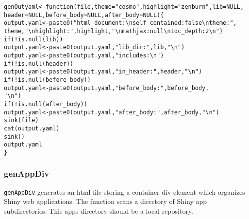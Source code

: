 \documentclass{article}\usepackage[]{graphicx}\usepackage[]{color}
\makeatletter
\newcommand{\hlstr}[1]{\textcolor[rgb]{0.863,0.196,0.184}{#1}}%
\newcommand{\hlopt}[1]{\textcolor[rgb]{0.576,0.631,0.631}{#1}}%
\newcommand{\hlstd}[1]{\textcolor[rgb]{0.514,0.58,0.588}{#1}}%
\newcommand{\hlkwa}[1]{\textcolor[rgb]{0.796,0.294,0.086}{#1}}%
\newcommand{\hlkwb}[1]{\textcolor[rgb]{0.522,0.6,0}{#1}}%
\newcommand{\hlkwc}[1]{\textcolor[rgb]{0.796,0.294,0.086}{#1}}%
\newcommand{\hlkwd}[1]{\textcolor[rgb]{0.576,0.631,0.631}{#1}}%
\newenvironment{kframe}{%
 \def\at@end@of@kframe{}%
 \ifinner\ifhmode%
  \def\at@end@of@kframe{\end{minipage}}%
  \begin{minipage}{\columnwidth}%
 \fi\fi%
 \def\FrameCommand##1{\hskip\@totalleftmargin \hskip-\fboxsep
 \colorbox{shadecolor}{##1}\hskip-\fboxsep
     \hskip-\linewidth \hskip-\@totalleftmargin \hskip\columnwidth}%
 \MakeFramed {\advance\hsize-\width
   \@totalleftmargin\z@ \linewidth\hsize
   \@setminipage}}%
 {\par\unskip\endMakeFramed%
 \at@end@of@kframe}
\newenvironment{knitrout}{}{} %
\makeatother
\begin{document}
\begin{knitrout}
\color{fgcolor}\begin{kframe}
\begin{alltt}
\hlstd{genOutyaml} \hlkwb{<-} \hlkwa{function}\hlstd{(}\hlkwc{file}\hlstd{,} \hlkwc{theme} \hlstd{=} \hlstr{"cosmo"}\hlstd{,} \hlkwc{highlight} \hlstd{=} \hlstr{"zenburn"}\hlstd{,} \hlkwc{lib} \hlstd{=} \hlkwa{NULL}\hlstd{,}
    \hlkwc{header} \hlstd{=} \hlkwa{NULL}\hlstd{,} \hlkwc{before_body} \hlstd{=} \hlkwa{NULL}\hlstd{,} \hlkwc{after_body} \hlstd{=} \hlkwa{NULL}\hlstd{) \{}
    \hlstd{output.yaml} \hlkwb{<-} \hlkwd{paste0}\hlstd{(}\hlstr{"html_document:\textbackslash{}n  self_contained: false\textbackslash{}n  theme: "}\hlstd{,}
        \hlstd{theme,} \hlstr{"\textbackslash{}n  highlight: "}\hlstd{, highlight,} \hlstr{"\textbackslash{}n  mathjax: null\textbackslash{}n  toc_depth: 2\textbackslash{}n"}\hlstd{)}
    \hlkwa{if} \hlstd{(}\hlopt{!}\hlkwd{is.null}\hlstd{(lib))}
        \hlstd{output.yaml} \hlkwb{<-} \hlkwd{paste0}\hlstd{(output.yaml,} \hlstr{"  lib_dir: "}\hlstd{, lib,} \hlstr{"\textbackslash{}n"}\hlstd{)}
    \hlstd{output.yaml} \hlkwb{<-} \hlkwd{paste0}\hlstd{(output.yaml,} \hlstr{"  includes:\textbackslash{}n"}\hlstd{)}
    \hlkwa{if} \hlstd{(}\hlopt{!}\hlkwd{is.null}\hlstd{(header))}
        \hlstd{output.yaml} \hlkwb{<-} \hlkwd{paste0}\hlstd{(output.yaml,} \hlstr{"    in_header: "}\hlstd{, header,} \hlstr{"\textbackslash{}n"}\hlstd{)}
    \hlkwa{if} \hlstd{(}\hlopt{!}\hlkwd{is.null}\hlstd{(before_body))}
        \hlstd{output.yaml} \hlkwb{<-} \hlkwd{paste0}\hlstd{(output.yaml,} \hlstr{"    before_body: "}\hlstd{, before_body,}
            \hlstr{"\textbackslash{}n"}\hlstd{)}
    \hlkwa{if} \hlstd{(}\hlopt{!}\hlkwd{is.null}\hlstd{(after_body))}
        \hlstd{output.yaml} \hlkwb{<-} \hlkwd{paste0}\hlstd{(output.yaml,} \hlstr{"    after_body: "}\hlstd{, after_body,} \hlstr{"\textbackslash{}n"}\hlstd{)}
    \hlkwd{sink}\hlstd{(file)}
    \hlkwd{cat}\hlstd{(output.yaml)}
    \hlkwd{sink}\hlstd{()}
    \hlstd{output.yaml}
\hlstd{\}}
\end{alltt}
\end{kframe}
\end{knitrout}

\subsubsection{genAppDiv}

\texttt{genAppDiv} generates an html file storing a container div element which organizes Shiny web applications.
The function scans a directory of Shiny app subdirectories.
This apps directory should be a local repository.
\end{document}
